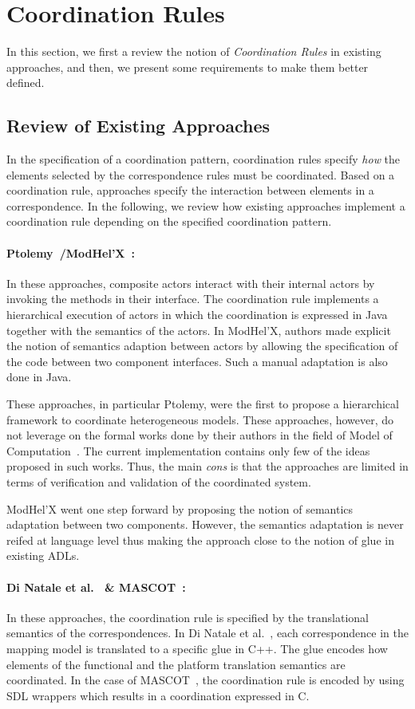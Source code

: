 \section{Coordination Rules}
In this section, we first a review the notion of \emph{Coordination Rules} in existing approaches, and then, we present some requirements to make them better defined. 

\subsection{Review of Existing Approaches}
In the specification of a coordination pattern, coordination rules specify \emph{how} the elements selected by the correspondence rules must be coordinated. Based on a coordination rule, approaches specify the interaction between elements in a correspondence. In the following, we review how existing approaches implement a coordination rule depending on the specified coordination pattern.  

\paragraph{Ptolemy~\cite{ptoleframebib}/ModHel'X~\cite{modhelxbib}:}	
In these approaches, composite actors interact with their internal actors by invoking the methods in their interface. The coordination rule implements a hierarchical execution of actors in which the coordination is expressed in Java together with the semantics of the actors. In ModHel'X, authors made explicit the notion of semantics adaption between actors by allowing the specification of the code between two component interfaces. Such a manual adaptation is also done in Java.

These approaches, in particular Ptolemy, were the first to propose a hierarchical framework to coordinate heterogeneous models. These approaches, however, do not leverage on the formal works done by their authors in the field of Model of Computation~\cite{lee1998framework}. The current implementation contains only few of the ideas proposed in such works. Thus, the main \emph{cons} is that the approaches are limited in terms of verification and validation of the coordinated system. 

ModHel'X went one step forward by proposing the notion of semantics adaptation between two components. However, the semantics adaptation is never reifed at language level thus making the approach close to the notion of glue in existing ADLs.

\paragraph{Di Natale et al.~\cite{dinatale} \& MASCOT~\cite{mascotbib}:}
In these approaches, the coordination rule is specified by the translational semantics of the correspondences. In Di Natale et al.~\cite{dinatale}, each correspondence in the mapping model is translated to a specific glue in C++. The glue encodes how elements of the functional and the platform translation semantics are coordinated. In the case of MASCOT~\cite{mascotbib}, the coordination rule is encoded by using SDL wrappers which results in a coordination expressed in C.

